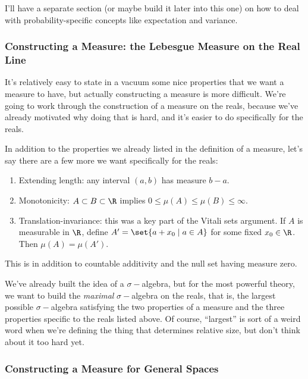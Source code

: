 \documentclass[./analysis.tex]{subfiles}
\begin{document}
    I'll have a separate section (or maybe build it later into this one) on how to deal with probability-specific concepts like expectation and variance.

    \subsubsection{Constructing a Measure: the Lebesgue Measure on the Real Line}

    It's relatively easy to state in a vacuum some nice properties that we want a measure to have, but actually constructing a measure is more difficult. We're going to work through the construction of a measure on the reals, because we've already motivated why doing that is hard, and it's easier to do specifically for the reals.

    In addition to the properties we already listed in the definition of a measure, let's say there are a few more we want specifically for the reals:

    \begin{enumerate}
        \item Extending length: any interval $(a, b)$ has measure $b - a$.
        \item Monotonicity: $A \subset B \subset \R$ implies $0 \leq \mu(A) \leq \mu(B) \leq \infty$.
        \item Translation-invariance: this was a key part of the Vitali sets argument. If $A$ is measurable in $\R$, define $A' = \set{a + x_0 \mid a \in A}$ for some fixed $x_0 \in \R$. Then $\mu(A) = \mu(A')$.
    \end{enumerate}

    This is in addition to countable additivity and the null set having measure zero.

    We've already built the idea of a $\sigma-$algebra, but for the most powerful theory, we want to build the \emph{maximal} $\sigma-$algebra on the reals, that is, the largest possible $\sigma-$algebra satisfying the two properties of a measure and the three properties specific to the reals listed above. Of course, ``largest'' is sort of a weird word when we're defining the thing that determines relative size, but don't think about it too hard yet.

    \subsubsection{Constructing a Measure for General Spaces}
\end{document}
